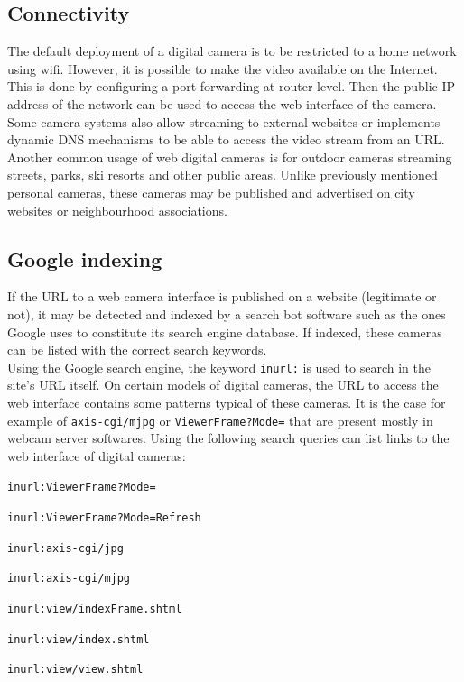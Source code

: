 \subsection{Connectivity}
\label{sec:cam-connect}

The default deployment of a digital camera is to be restricted to a home network using wifi.
However, it is possible to make the video available on the Internet.
This is done by configuring a port forwarding at router level.
Then the public IP address of the network can be used to access the web interface of the camera.
Some camera systems also allow streaming to external websites or implements dynamic DNS mechanisms to be able to access the video stream from an URL.\\

Another common usage of web digital cameras is for outdoor cameras streaming streets, parks, ski resorts and other public areas.
Unlike previously mentioned personal cameras, these cameras may be published and advertised on city websites or neighbourhood associations.

\subsection{Google indexing}

If the URL to a web camera interface is published on a website (legitimate or not), it may be detected and indexed by a search bot software such as the ones Google uses to constitute its search engine database.
If indexed, these cameras can be listed with the correct search keywords.\\

Using the Google search engine, the keyword \texttt{inurl:} is used to search in the site's URL itself.
On certain models of digital cameras, the URL to access the web interface contains some patterns typical of these cameras.
It is the case for example of \texttt{axis-cgi/mjpg} or \texttt{ViewerFrame?Mode=} that are present mostly in webcam server softwares.
Using the following search queries can list links to the web interface of digital cameras:

\begin{itemizealt}
\item \texttt{inurl:ViewerFrame?Mode=}
\item \texttt{inurl:ViewerFrame?Mode=Refresh}
\item \texttt{inurl:axis-cgi/jpg}
\item \texttt{inurl:axis-cgi/mjpg}
\item \texttt{inurl:view/indexFrame.shtml}
\item \texttt{inurl:view/index.shtml}
\item \texttt{inurl:view/view.shtml}
\end{itemizealt}

